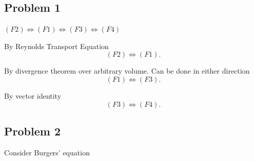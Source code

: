 
\subsectionfont{\fontsize{10}{10}\selectfont}

\subsection{Problem 1}%

$(F2)\Leftrightarrow(F1)\Leftrightarrow(F3)\Leftrightarrow(F4)$

By Reynolds Transport Equation
\[
(F2)\Leftrightarrow(F1)
.\] 

By divergence theorem over arbitrary volume. Can be done in either direction
\[
(F1)\Leftrightarrow(F3)
.\] 

By vector identity
\[
(F3)\Leftrightarrow(F4)
.\] 

\subsection{Problem 2}%

Consider Burgers' equation

